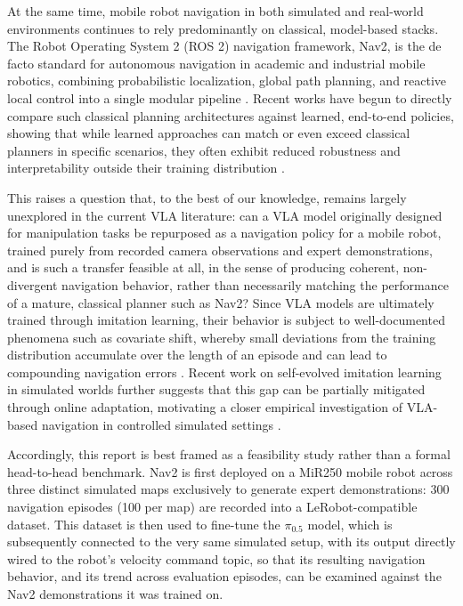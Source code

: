 \documentclass[conference]{IEEEtran}
\begin{document}
At the same time, mobile robot navigation in both simulated and real-world environments continues to rely predominantly on classical, model-based stacks. The Robot Operating System 2 (ROS 2) navigation framework, Nav2, is the de facto standard for autonomous navigation in academic and industrial mobile robotics, combining probabilistic localization, global path planning, and reactive local control into a single modular pipeline \cite{wei2025rosnavigation}. Recent works have begun to directly compare such classical planning architectures against learned, end-to-end policies, showing that while learned approaches can match or even exceed classical planners in specific scenarios, they often exhibit reduced robustness and interpretability outside their training distribution \cite{gapud2025classicvsete, xu2021localmotionplanning}.

This raises a question that, to the best of our knowledge, remains largely unexplored in the current VLA literature: can a VLA model originally designed for manipulation tasks be repurposed as a navigation policy for a mobile robot, trained purely from recorded camera observations and expert demonstrations, and is such a transfer feasible at all, in the sense of producing coherent, non-divergent navigation behavior, rather than necessarily matching the performance of a mature, classical planner such as Nav2? Since VLA models are ultimately trained through imitation learning, their behavior is subject to well-documented phenomena such as covariate shift, whereby small deviations from the training distribution accumulate over the length of an episode and can lead to compounding navigation errors \cite{zare2023imitationsurvey, spencer2020feedback, mehta2024stablebc}. Recent work on self-evolved imitation learning in simulated worlds further suggests that this gap can be partially mitigated through online adaptation, motivating a closer empirical investigation of VLA-based navigation in controlled simulated settings \cite{ye2026selfevolved}.

Accordingly, this report is best framed as a feasibility study rather than a formal head-to-head benchmark. Nav2 is first deployed on a MiR250 mobile robot across three distinct simulated maps exclusively to generate expert demonstrations: 300 navigation episodes (100 per map) are recorded into a LeRobot-compatible dataset. This dataset is then used to fine-tune the $\pi_{0.5}$ model, which is subsequently connected to the very same simulated setup, with its output directly wired to the robot's velocity command topic, so that its resulting navigation behavior, and its trend across evaluation episodes, can be examined against the Nav2 demonstrations it was trained on.
\end{document}
